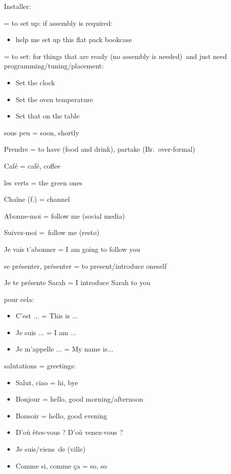Installer:

= to set up: if assembly is required:

\begin{itemize}
\item
  help me set up this flat pack bookcase
\end{itemize}

= to set: for things that are ready (no assembly is needed)~and just
need programming/tuning/placement:

\begin{itemize}
\item
  Set the clock~
\item
  Set the oven temperature~
\item
  Set that on the table~
\end{itemize}

sous peu = soon, shortly

Prendre = to have (food and drink), partake (Br.~over-formal)

Café = café, coffee~

les verts = the green ones

Chaîne (f.) = channel~

Abonne-moi = follow me (social media)

Suivez-moi =~follow me (resto)

Je vais t'abonner = I am going to follow you~

se présenter, présenter = to present/introduce oneself

Je te présente Sarah = I introduce Sarah to you~

pour cela:

\begin{itemize}
\item
  C'est ... = This is ...
\item
  Je suis ... = I am ...
\item
  Je m'appelle ... = My name is...
\end{itemize}

salutations = greetings:

\begin{itemize}
\item
  Salut, ciao = hi, bye
\item
  Bonjour = hello, good morning/afternoon
\item
  Bonsoir = hello, good evening~
\item
  D'où êtes-vous ? D'où venez-vous ?
\item
  Je suis/viens~de (ville)
\item
  Comme si, comme ça = so, so
\end{itemize}

